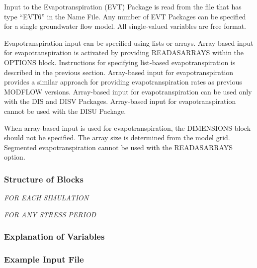 Input to the Evapotranspiration (EVT) Package is read from the file that has type ``EVT6'' in the Name File. Any number of EVT Packages can be specified for a single groundwater flow model. All single-valued variables are free format.

Evapotranspiration input can be specified using lists or arrays.  Array-based input for evapotranspiration is activated by providing READASARRAYS within the OPTIONS block.   Instructions for specifying list-based evapotranspiration is described in the previous section.  Array-based input for evapotranspiration provides a similar approach for providing evapotranspiration rates as previous MODFLOW versions.  Array-based input for evapotranspiration can be used only with the DIS and DISV Packages.  Array-based input for evapotranspiration cannot be used with the DISU Package.

When array-based input is used for evapotranspiration, the DIMENSIONS block should not be specified.  The array size is determined from the model grid.   Segmented evapotranspiration cannot be used with the READASARRAYS option.

\vspace{5mm}
\subsubsection{Structure of Blocks}
\vspace{5mm}

\noindent \textit{FOR EACH SIMULATION}

\vspace{5mm}
\noindent \textit{FOR ANY STRESS PERIOD}

\packageperioddescription

\vspace{5mm}
\subsubsection{Explanation of Variables}
\begin{description}

\end{description}

\vspace{5mm}
\subsubsection{Example Input File}

